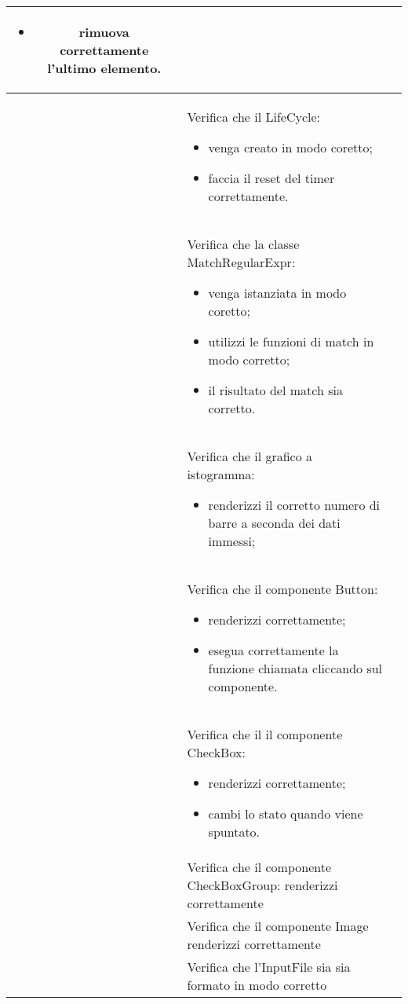 \begin{longtable}{|c|P{9cm}|c|}
\begin{itemize}
		\item rimuova correttamente l'ultimo elemento.
	\end{itemize}
	 \\
	\hline {}\label{tu-lifecycle} & Verifica che il LifeCycle:
	\begin{itemize}
		\item venga creato in modo coretto;
		\item faccia il reset del timer correttamente.
	\end{itemize}
	 \\
	\hline {}\label{tu-regex} & Verifica che la classe MatchRegularExpr:
	\begin{itemize}
		\item venga istanziata in modo coretto;
		\item utilizzi le funzioni di match in modo corretto;
		\item il risultato del match sia corretto.
	\end{itemize}
	 \\
	\hline {}\label{tu-barchart} & Verifica che il grafico a istogramma:
	\begin{itemize}
		\item renderizzi il corretto numero di barre a seconda dei dati immessi;
	\end{itemize}
	 \\
	\hline {}\label{tu-button} & Verifica che il componente Button:
	\begin{itemize}
		\item renderizzi correttamente;
		\item esegua correttamente la funzione chiamata cliccando sul componente.
	\end{itemize}
	 \\
	\hline {}\label{tu-checkbox} & Verifica che il il componente CheckBox:
	\begin{itemize}
		\item renderizzi correttamente;
		\item cambi lo stato quando viene spuntato.
	\end{itemize}
	 \\
	\hline {}\label{tu-checkboxgroup} & Verifica che il componente CheckBoxGroup: renderizzi correttamente  \\
	\hline {}\label{tu-image} & Verifica che il componente Image renderizzi correttamente	 \\
	\hline {}\label{tu-inputfile} & Verifica che l'InputFile sia sia formato in modo corretto  \\

\end{longtable}
